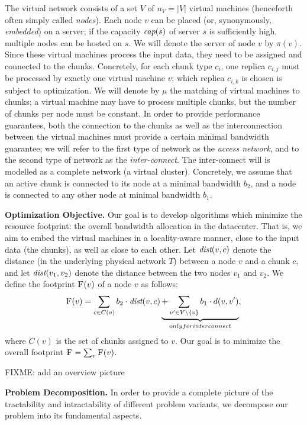\documentclass[9pt,twocolumn]{scrartcl}
\newcommand{\VirtualNodes}{\ensuremath{V}}
\newcommand{\achunk}{\ensuremath{c}}
\newcommand{\capacity}{\emph{cap}}
\newcommand{\dist}{\emph{dist}}
\newcommand{\Cost}{\textsc{F}}
\newcommand{\Tree}{\ensuremath{T}}
\newcommand{\CostCom}{\ensuremath{b_1}}
\newcommand{\CostTrans}{\ensuremath{b_2}}
\begin{document}
The virtual network consists of a set $\VirtualNodes$ of $n_V=|\VirtualNodes|$ virtual machines (henceforth often simply called \emph{nodes}).
Each node $v$ can be placed (or, synonymously, \emph{embedded}) on a server; if the capacity $\capacity(s)$ of server $s$ is sufficiently high, multiple nodes can be hosted on $s$. We will denote the server of node $v$ by $\pi(v)$.
Since these virtual machines process the input data, they need to be assigned and connected to the
chunks. Concretely, for each chunk type $\achunk_i$, one replica $\achunk_{i,j}$ must be processed by exactly one virtual machine $v$;
which replica $\achunk_{i,k}$ is chosen is subject to optimization.
We will denote by $\mu$ the matching of virtual machines to chunks; a virtual machine
may have to process multiple chunks, but the number of chunks per node must be constant.
In order to provide performance guarantees, both the connection to the chunks
as well as the interconnection between the virtual machines must provide a certain
minimal bandwidth guarantee; we will refer to the first type of network as the \emph{access
network}, and to the second type of network as the \emph{inter-connect}. The inter-connect will
is modelled as a complete network (a virtual cluster). Concretely, we assume that an  active chunk
is connected to its node at a minimal bandwidth $\CostTrans$, and a node is connected to any other node
at minimal bandwidth $\CostCom$.

\textbf{Optimization Objective.} Our goal is to develop algorithms which minimize
the resource footprint: the overall bandwidth allocation in the datacenter. That is,
we aim to embed the virtual machines in a locality-aware manner, close to the input data
(the chunks), as well as close to
each other. Let $\dist(v,\achunk)$ denote the distance (in the underlying physical network $\Tree$) between a node $v$ and a
chunk $\achunk$, and let $\dist(v_1,v_2)$ denote the distance between the two nodes $v_1$ and $v_2$.
We define the footprint $\Cost(v)$ of a node $v$ as follows:
$$
\Cost(v) = \sum_{\achunk\in C(v)} \CostTrans \cdot \dist(v,\achunk) \underbrace{+ \sum_{v' \in \VirtualNodes\setminus\{v\}} \CostCom \cdot d(v,v')}_{\text only for interconnect},
$$
where $C(v)$ is the set of chunks assigned to $v$. Our goal is to minimize the overall footprint
$\Cost=\sum_v \Cost(v)$.


FIXME: add an overview picture

\textbf{Problem Decomposition.}
In order to provide a complete picture of the tractability and intractability of different
problem variants, we decompose our problem into its fundamental aspects.
\end{document}
